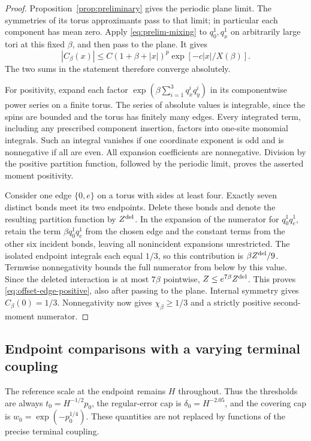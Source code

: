 \begin{proof}
Proposition~\ref{prop:preliminary} gives the periodic plane limit.
The symmetries of its torus approximants pass to that limit; in
particular each component has mean zero.  Apply
\eqref{eq:prelim-mixing} to $q_0^1,q_x^1$ on arbitrarily large tori
at this fixed $\beta$, and then pass to the plane.  It gives
\[
 |C_\beta(x)|\le
 C(1+\beta+|x|)^p\exp[-c|x|/X(\beta)].
\]
The two sums in the statement therefore converge absolutely.

For positivity, expand each factor
$\exp(\beta\sum_{i=1}^3q_x^iq_y^i)$ in its componentwise power series
on a finite torus.  The series of absolute values is integrable,
since the spins are bounded and the torus has finitely many edges.
Every integrated term, including any prescribed component insertion,
factors into one-site monomial integrals.  Such an integral vanishes
if one coordinate exponent is odd and is nonnegative if all are
even.  All expansion coefficients are nonnegative.  Division by the
positive partition function, followed by the periodic limit, proves
the asserted moment positivity.

Consider one edge $\{0,e\}$ on a torus with sides at least four.
Exactly seven distinct bonds meet its two endpoints.  Delete these
bonds and denote the resulting partition function by $Z^{\rm del}$.
In the expansion of the numerator for $q_0^1q_e^1$, retain the term
$\beta q_0^1q_e^1$ from the chosen edge and the constant terms from
the other six incident bonds, leaving all nonincident expansions
unrestricted.  The isolated endpoint integrals each equal $1/3$,
so this contribution is $\beta Z^{\rm del}/9$.  Termwise
nonnegativity bounds the full numerator from below by this value.
Since the deleted interaction is at most $7\beta$ pointwise,
$Z\le e^{7\beta}Z^{\rm del}$.  This proves
\eqref{eq:offset-edge-positive}, also after passing to the plane.
Internal symmetry gives $C_\beta(0)=1/3$.  Nonnegativity now gives
$\chi_\beta\ge1/3$ and a strictly positive second-moment numerator.
\end{proof}

\subsection{Endpoint comparisons with a varying terminal coupling}

The reference scale at the endpoint remains $H$ throughout.  Thus the
thresholds are always $t_0=H^{-1/2}p_0$, the regular-error cap is
$\delta_0=H^{-2.05}$, and the covering cap is
$w_0=\exp(-p_0^{1/4})$.  These quantities are not replaced by
functions of the precise terminal coupling.

